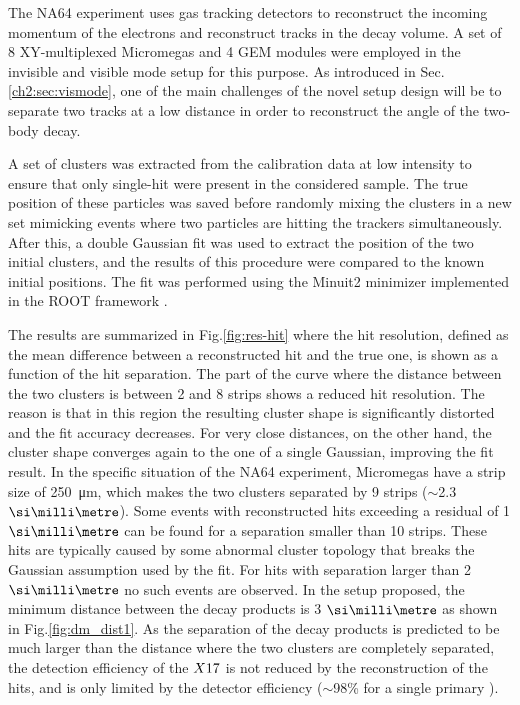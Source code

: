 The NA64 experiment uses gas tracking detectors to reconstruct the incoming momentum of the electrons and reconstruct tracks in the decay volume. A set of 8 XY-multiplexed Micromegas and 4 GEM modules were employed in the invisible and visible mode setup for this purpose. As introduced in Sec.\ref{ch2:sec:vismode}, one of the main challenges of the novel setup design will be to separate two tracks at a low distance in order to reconstruct the angle of the two-body decay.

A set of clusters was extracted from the calibration data at low intensity to ensure that only single-hit were present in the considered sample. The true position of these particles was saved before randomly mixing the clusters in a new set mimicking events where two particles are hitting the trackers simultaneously. After this, a double Gaussian fit was used to extract the position of the two initial clusters, and the results of this procedure were compared to the known initial positions. The fit was performed using the Minuit2 minimizer implemented in the ROOT framework \cite{root}.

The results are summarized in Fig.\ref{fig:res-hit} where the hit resolution, defined as the mean difference between a reconstructed hit and the true one, is shown as a function of the hit separation. The part of the curve where the distance between the two clusters is between 2 and 8 strips shows a reduced hit resolution. The reason is that in this region the resulting cluster shape is significantly distorted and the fit accuracy decreases. For very close distances, on the other hand, the cluster shape converges again to the one of a single Gaussian, improving the fit result. In the specific situation of the NA64 experiment, Micromegas have a strip size of \SI{250}{\micro\meter}, which makes the two clusters separated by 9 strips ($\sim$2.3 $\mmi$). Some events with reconstructed hits exceeding a residual of 1 $\mmi$ can be found for a separation smaller than 10 strips. These hits are typically caused by some abnormal cluster topology that breaks the Gaussian assumption used by the fit. For hits with separation larger than 2 $\mmi$ no such events are observed. In the setup proposed, the minimum distance between the decay products is 3 $\mmi$ as shown in Fig.\ref{fig:dm_dist1}. As the separation of the decay products is predicted to be much larger than the distance where the two clusters are completely separated, the detection efficiency of the $X17$ is not reduced by the reconstruction of the hits, and is only limited by the detector efficiency ($\sim$98\% for a single primary \cite{Banerjee:2017mdu}).

